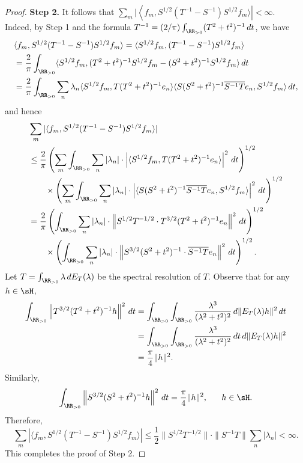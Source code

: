 \documentclass[12pt,draft]{article}
\theoremstyle{plain}
\numberwithin{equation}{section}
\theoremstyle{remark}
\begin{document}
\begin{proof}
\textbf{Step 2.} It follows that $\sum_m|\left\langle f_m,S^{1/2}(T^{-1}-S^{-1})S^{1/2}f_m\rangle\right|<\infty$.\\
Indeed, by Step 1 and the formula $T^{-1}=(2/\pi)\int_{\RR_{>0}}(T^2+t^2)^{-1}\,dt$, we have
\begin{align*}
&\langle f_m,S^{1/2}(T^{-1}-S^{-1})S^{1/2}f_m\rangle = \langle S^{1/2}f_m,(T^{-1}-S^{-1})S^{1/2}f_m\rangle\\
&= \frac{2}{\pi}\int_{\RR_{>0}}\langle S^{1/2}f_m,(T^2+t^2)^{-1}S^{1/2}f_m-(S^2+t^2)^{-1}S^{1/2}f_m\rangle\,dt\\
&= \frac{2}{\pi}\int_{\RR_{>0}}\sum_n
\lambda_n\langle S^{1/2}f_m,T(T^2+t^2)^{-1}e_n\rangle\langle S(S^2+t^2)^{-1}\overline{S^{-1}T}e_n,S^{1/2}f_m\rangle\,dt,
\end{align*}
and hence
\begin{align*}
& \sum_m|\langle f_m,S^{1/2}(T^{-1}-S^{-1})S^{1/2}f_m\rangle|\\
& \leq \frac{2}{\pi}\left(\sum_m\int_{\RR_{>0}}\sum_n|\lambda_n|\cdot\left|\langle S^{1/2}f_m,T(T^2+t^2)^{-1}e_n\rangle\right|^2\,dt\right)^{1/2}\\
& \qquad 
  \times\left(\sum_m\int_{\RR_{>0}}\sum_n|\lambda_n|\cdot\left|\langle S(S^2+t^2)^{-1}\overline{S^{-1}T}e_n,S^{1/2}f_m\rangle\right|^2\,dt\right)^{1/2}\\
& = \frac{2}{\pi}\left(\int_{\RR_{>0}}\sum_n|\lambda_n|\cdot\left\|S^{1/2}T^{-1/2}\cdot T^{3/2}(T^2+t^2)^{-1}e_n\right\|^2\,dt\right)^{1/2}\\
& \qquad 
  \times\left(\int_{\RR_{>0}}\sum_n|\lambda_n|\cdot\left\|S^{3/2}(S^2+t^2)^{-1}\cdot\overline{S^{-1}T}e_n\right\|^2\,dt\right)^{1/2}.
\end{align*}
Let $T=\int_{\RR_{>0}}\lambda\,dE_T(\lambda)$ be the spectral resolution of $T$.
Observe that for any $h\in\sH$,
\begin{align*}
 \int_{\RR_{>0}}\left\|T^{3/2}(T^2+t^2)^{-1}h\right\|^2\,dt
& = \int_{\RR_{>0}}\int_{\RR_{>0}}\frac{\lambda^3}{(\lambda^2+t^2)^2}\,d\|E_T(\lambda)h\|^2\,dt\\
& = \int_{\RR_{>0}}\int_{\RR_{>0}}\frac{\lambda^3}{(\lambda^2+t^2)^2}\,dt\,d\|E_T(\lambda)h\|^2 \\
& = \frac{\pi}{4}\|h\|^2.
\end{align*}
Similarly, 
\[
\int_{\RR_{>0}}\left\|S^{3/2}(S^2+t^2)^{-1}h\right\|^2\,dt =  \frac{\pi}{4}\|h\|^2, \ \ \ \ \ h\in\sH.
\]
Therefore, 
\[
\sum_m\left|\langle f_m,S^{1/2}(T^{-1}-S^{-1})S^{1/2}f_m\rangle\right| 
\leq \frac{1}{2}\|S^{1/2}T^{-1/2}\|\cdot\|S^{-1}T\|\sum_n|\lambda_n|
< \infty.
\]
This completes the proof of Step 2.


\end{proof}
\end{document}
